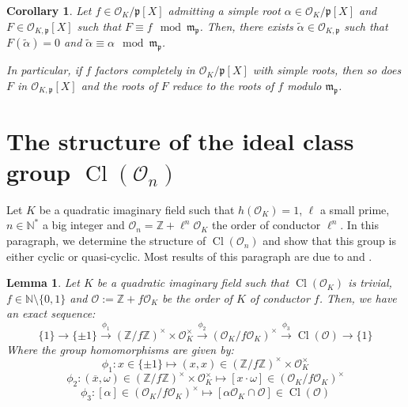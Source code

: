 \documentclass[a4paper,10pt]{report}
\theoremstyle{definition}
\theoremstyle{plain}
\newtheorem{lemma}[definition]{Lemma}
\newtheorem{corollary}[definition]{Corollary}
\theoremstyle{definition}
\newcommand{\N}{\mathbb{N}}
\newcommand{\Z}{\mathbb{Z}}
\newcommand{\mO}{\mathcal{O}}
\renewcommand{\(}{\left(}
\renewcommand{\)}{\right)}
\newcommand{\mf}[1]{\mathfrak{#1}}
\DeclareMathOperator{\Cl}{Cl}
\begin{document}
\begin{corollary}\label{corollary 3}
Let $f\in \mO_K/\mf{p}[X]$ admitting a simple root $\alpha\in \mO_K/\mf{p}[X]$ and $F\in \mO_{K,\mf{p}}[X]$ such that $F\equiv f \mod \mf{m}_{\mf{p}}$. Then, there exists $\tilde{\alpha}\in \mO_{K,\mf{p}}$ such that $F(\tilde{\alpha})=0$ and $\tilde{\alpha}\equiv \alpha \mod \mf{m}_{\mf{p}}$. 

In particular, if $f$ factors completely in $\mO_K/\mf{p}[X]$ with simple roots, then so does $F$ in $\mO_{K,\mf{p}}[X]$ and the roots of $F$ reduce to the roots of $f$ modulo $\mf{m}_{\mf{p}}$.
\end{corollary}

\section{The structure of the ideal class group $\Cl(\mO_n)$}\label{appendix 1}

Let $K$ be a quadratic imaginary field such that $h(\mO_K)=1$, $\ell$ a small prime, $n\in\N^*$ a big integer and $\mO_n=\Z+\ell^n\mO_K$ the order of conductor $\ell^n$.  In this paragraph, we determine the structure of $\Cl(\mO_n)$ and show that this group is either cyclic or quasi-cyclic. Most results of this paragraph are due to \cite[chapter 7]{Cox} and \cite[chapter 4]{Cohen2}.

\begin{lemma}
Let $K$ be a quadratic imaginary field such that $\Cl(\mO_K)$ is trivial, $f\in\N\setminus\{0,1\}$ and $\mO:=\Z+f\mO_K$ be the order of $K$ of conductor $f$. Then, we have an exact sequence:
\[\{1\}\longrightarrow\{\pm 1\}\overset{\phi_1}{\longrightarrow} (\Z/f\Z)^\times\times \mO_K^\times\overset{\phi_2}{\longrightarrow} (\mO_K/f\mO_K)^\times\overset{\phi_3}{\longrightarrow} \Cl(\mO)\longrightarrow\{1\}\]
Where the group homomorphisms are given by:
\[\phi_1:x\in\{\pm 1\}\longmapsto (x,x)\in (\Z/f\Z)^\times\times \mO_K^\times\]
\[\phi_2:(\overline{x},\omega)\in (\Z/f\Z)^\times\times \mO_K^\times\longmapsto [x\cdot \omega]\in(\mO_K/f\mO_K)^\times\]
\[\phi_3:[\alpha]\in(\mO_K/f\mO_K)^\times\longmapsto [\alpha\mO_K\cap\mO]\in \Cl(\mO)\]
\end{lemma}
\end{document}
